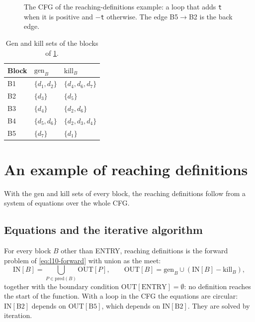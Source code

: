 \documentclass[../main.tex]{subfiles}
\begin{document}
\begin{figure}[tb]
  \centering
  
  \caption{The CFG of the reaching-definitions example: a loop that
    adds \texttt{t} when it is positive and $-$\texttt{t} otherwise.
    The edge B5$\to$B2 is the back edge.}
  \label{fig:l10-rd-cfg}
\end{figure}

\begin{table}[tb]
  \centering
  \small
  \caption{Gen and kill sets of the blocks of \cref{fig:l10-rd-cfg}.}
  \label{tab:l10-genkill}
  \begin{tabular}{@{}l>{\raggedright\arraybackslash}p{24mm}
                  >{\raggedright\arraybackslash}p{24mm}@{}}
    \toprule
    Block & $\mathrm{gen}_B$ & $\mathrm{kill}_B$ \\
    \midrule
    B1 & $\{d_1,d_2\}$ & $\{d_4,d_6,d_7\}$ \\
    B2 & $\{d_3\}$ & $\{d_5\}$ \\
    B3 & $\{d_4\}$ & $\{d_2,d_6\}$ \\
    B4 & $\{d_5,d_6\}$ & $\{d_2,d_3,d_4\}$ \\
    B5 & $\{d_7\}$ & $\{d_1\}$ \\
    \bottomrule
  \end{tabular}
\end{table}

\section{An example of reaching definitions}
\label{sec:l10-rd-example}

With the gen and kill sets of every block, the reaching definitions
follow from a system of equations over the whole CFG.

\subsection{Equations and the iterative algorithm}

For every block $B$ other than ENTRY, reaching definitions is the
forward problem of \cref{eq:l10-forward} with union as the meet:
\begin{equation}
  \label{eq:l10-rd}
  \mathrm{IN}[B]=\bigcup_{P\in\mathrm{pred}(B)}\mathrm{OUT}[P],\qquad
  \mathrm{OUT}[B]=\mathrm{gen}_B\cup(\mathrm{IN}[B]-\mathrm{kill}_B),
\end{equation}
together with the boundary condition
$\mathrm{OUT}[\mathrm{ENTRY}]=\emptyset$: no definition reaches the
start of the function.  With a loop in the
CFG the equations are circular: $\mathrm{IN}[\mathrm{B2}]$ depends on
$\mathrm{OUT}[\mathrm{B5}]$, which depends on
$\mathrm{IN}[\mathrm{B2}]$.  They are solved by iteration.
\end{document}
